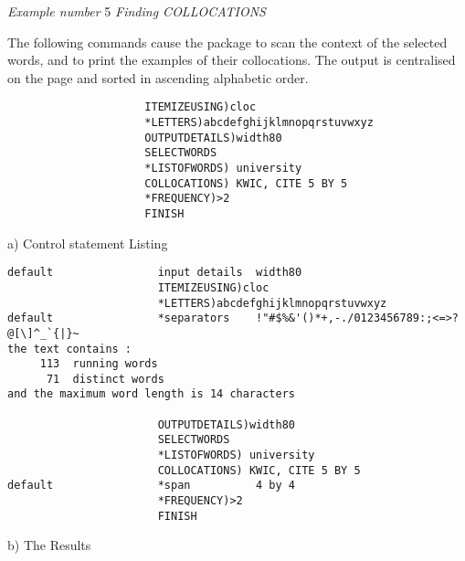 \newpage
 {\em Example number} 5               {\em Finding COLLOCATIONS}

 The following commands cause the package to scan the context of
 the selected words, and to print the examples of their collocations.
 The output is centralised on the page and sorted in ascending alphabetic
 order.
\begin{verbatim}
                     ITEMIZEUSING)cloc
                     *LETTERS)abcdefghijklmnopqrstuvwxyz
                     OUTPUTDETAILS)width80
                     SELECTWORDS
                     *LISTOFWORDS) university
                     COLLOCATIONS) KWIC, CITE 5 BY 5
                     *FREQUENCY)>2
                     FINISH
\end{verbatim}
                     a)   Control statement Listing
\begin{verbatim}
default                input details  width80
                       ITEMIZEUSING)cloc
                       *LETTERS)abcdefghijklmnopqrstuvwxyz
default                *separators    !"#$%&'()*+,-./0123456789:;<=>?@[\]^_`{|}~
the text contains :
     113  running words
      71  distinct words
and the maximum word length is 14 characters

                       OUTPUTDETAILS)width80
                       SELECTWORDS
                       *LISTOFWORDS) university
                       COLLOCATIONS) KWIC, CITE 5 BY 5
default                *span          4 by 4
                       *FREQUENCY)>2
                       FINISH
\end{verbatim}
                     b) The Results
